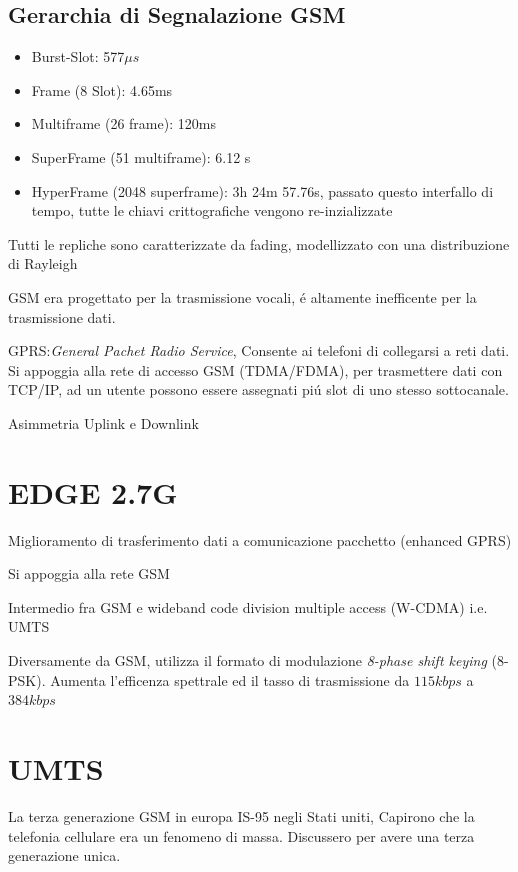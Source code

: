 \documentclass{article}
\begin{document}
\subsection{Gerarchia di Segnalazione GSM}
\begin{itemize}
    \item Burst-Slot: 577$\mu s$
    \item Frame (8 Slot): 4.65ms
    \item Multiframe (26 frame): 120ms
    \item SuperFrame (51 multiframe): 6.12 s
    \item HyperFrame (2048 superframe): 3h 24m 57.76s, passato questo interfallo di tempo, tutte le chiavi crittografiche vengono re-inzializzate
\end{itemize}


Tutti le repliche sono caratterizzate da fading, modellizzato con una distribuzione di Rayleigh


GSM era progettato per la trasmissione vocali, \'e altamente inefficente per la trasmissione dati.

GPRS:\@\textit{General Pachet Radio Service}, Consente ai telefoni di collegarsi a reti dati. Si appoggia alla rete di accesso GSM (TDMA/FDMA), per trasmettere dati con TCP/IP, ad un utente possono essere assegnati pi\'u slot di uno stesso sottocanale.

Asimmetria Uplink e Downlink

\section{EDGE 2.7G}

Miglioramento di trasferimento dati a comunicazione pacchetto (enhanced GPRS)

Si appoggia alla rete GSM

Intermedio fra GSM e wideband code division multiple access (W-CDMA) i.e. UMTS

Diversamente da GSM, utilizza il formato di modulazione \textit{8-phase shift keying} (8-PSK). Aumenta l'efficenza spettrale ed il tasso di trasmissione da $115kbps$ a $384kbps$

\newpage


\newpage
\section{UMTS}
La terza generazione GSM in europa IS-95 negli Stati uniti, Capirono che la telefonia cellulare era un fenomeno di massa.
Discussero per avere una terza generazione unica.
\end{document}
